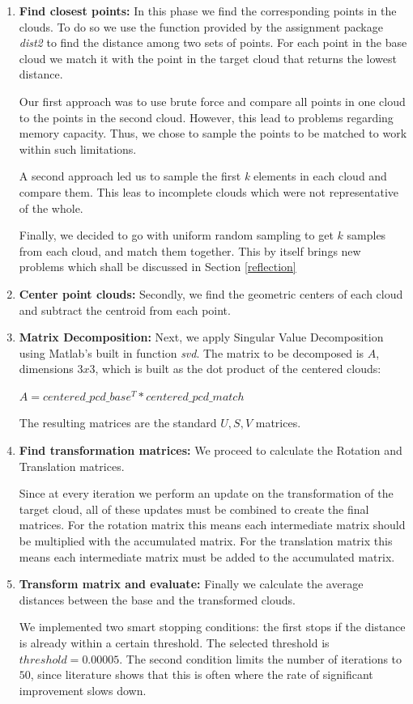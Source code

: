 \documentclass[11pt]{article}
\begin{document}
\begin{enumerate}
	\item \textbf{Find closest points:} In this phase we find the corresponding points in the clouds. To do so we use the function provided by the assignment package \textit{dist2} to find the distance among two sets of points. For each point in the base cloud we match it with the point in the target cloud that returns the lowest distance. 
	
	Our first approach was to use brute force and compare all points in one cloud to the points in the second cloud. However, this lead to problems regarding memory capacity. Thus, we chose to sample the points to be matched to work within such limitations.
	
	A second approach led us to sample the first \textit{k} elements in each cloud and compare them. This leas to incomplete clouds which were not representative of the whole.
	
	Finally, we decided to go with uniform random sampling to get $k$ samples from each cloud, and match them together. This by itself brings new problems which shall be discussed in Section \ref{reflection}
	
	\item \textbf{Center point clouds:} Secondly, we find the geometric centers of each cloud and subtract the centroid from each point. 
	
	\item \textbf{Matrix Decomposition:} Next, we apply Singular Value Decomposition using Matlab's built in function \textit{svd}. The matrix to be decomposed is $A$, dimensions $3 x 3$, which is built as the dot product of the centered clouds: 
	
	\begin{center}
		$A = centered\_pcd\_base^T * centered\_pcd\_match$
	\end{center}
	
	The resulting matrices are the standard $U, S, V$ matrices.	
	
	\item \textbf{Find transformation matrices:} We proceed to calculate the Rotation and Translation matrices. 
	
	Since at every iteration we perform an update on the transformation of the target cloud, all of these updates must be combined to create the final matrices. For the rotation matrix this means each intermediate matrix should be multiplied with the accumulated matrix. For the translation matrix this means each intermediate matrix must be added to the accumulated matrix.
	
	\item \textbf{Transform matrix and evaluate:} Finally we calculate the average distances between the base and the transformed clouds. 
	
	We implemented two smart stopping conditions: the first stops if the distance is already within a certain threshold. The selected threshold is $ threshold = 0.00005 $. The second condition limits the number of iterations to $50$, since literature shows that this is often where the rate of significant improvement slows down.
\end{enumerate}
\end{document}
